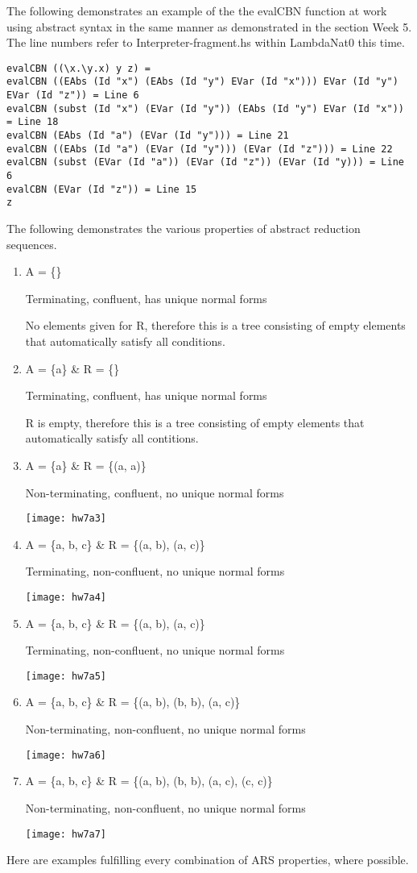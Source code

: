 \documentclass{article}
\theoremstyle{theorem}
\theoremstyle{definition}
\theoremstyle{remark}
\begin{document}
\medskip\noindent
The following demonstrates an example of the the evalCBN function at work using abstract syntax in the same manner as demonstrated in the section Week 5. The line numbers refer to Interpreter-fragment.hs within LambdaNat0 this time.

\begin{lstlisting}
evalCBN ((\x.\y.x) y z) =
evalCBN ((EAbs (Id "x") (EAbs (Id "y") EVar (Id "x"))) EVar (Id "y") EVar (Id "z")) = Line 6
evalCBN (subst (Id "x") (EVar (Id "y")) (EAbs (Id "y") EVar (Id "x")) = Line 18
evalCBN (EAbs (Id "a") (EVar (Id "y"))) = Line 21
evalCBN ((EAbs (Id "a") (EVar (Id "y"))) (EVar (Id "z"))) = Line 22
evalCBN (subst (EVar (Id "a")) (EVar (Id "z")) (EVar (Id "y))) = Line 6
evalCBN (EVar (Id "z")) = Line 15
z
\end{lstlisting}
%
The following demonstrates the various properties of abstract reduction sequences.

\begin{enumerate}
\item {A = \{\}

Terminating, confluent, has unique normal forms

No elements given for R, therefore this is a tree consisting of empty elements that automatically satisfy all conditions.}
\item {A = \{a\} \& R = \{\}

Terminating, confluent, has unique normal forms

R is empty, therefore this is a tree consisting of empty elements that automatically satisfy all contitions.}
\item {A = \{a\} \& R = \{(a, a)\}

Non-terminating, confluent, no unique normal forms

\texttt{[image: hw7a3]}}
\item {A = \{a, b, c\} \& R = \{(a, b), (a, c)\}

Terminating, non-confluent, no unique normal forms

\texttt{[image: hw7a4]}}
\item {A = \{a, b, c\} \& R = \{(a, b), (a, c)\}

Terminating, non-confluent, no unique normal forms

\texttt{[image: hw7a5]}}
\item {A = \{a, b, c\} \& R = \{(a, b), (b, b), (a, c)\}

Non-terminating, non-confluent, no unique normal forms

\texttt{[image: hw7a6]}}
\item {A = \{a, b, c\} \& R = \{(a, b), (b, b), (a, c), (c, c)\}

Non-terminating, non-confluent, no unique normal forms

\texttt{[image: hw7a7]}}
\end{enumerate}
%
Here are examples fulfilling every combination of ARS properties, where possible.
\end{document}
